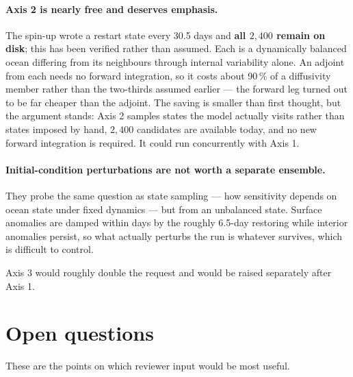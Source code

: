 \paragraph{Axis 2 is nearly free and deserves emphasis.}
The spin-up wrote a restart state every 30.5 days and \textbf{all $2{,}400$
remain on disk}; this has been verified rather than assumed. Each is a
dynamically balanced ocean differing from its neighbours through internal
variability alone. An adjoint from each needs no forward integration, so it costs
about 90\,\% of a diffusivity member rather than the two-thirds assumed earlier
--- the forward leg turned out to be far cheaper than the adjoint. The saving is
smaller than first thought, but the argument stands: Axis 2 samples states the
model actually visits rather than states imposed by hand, $2{,}400$ candidates
are available today, and no new forward integration is required. It could run
concurrently with Axis 1.

\paragraph{Initial-condition perturbations are not worth a separate ensemble.}
They probe the same question as state sampling --- how sensitivity depends on
ocean state under fixed dynamics --- but from an unbalanced state. Surface
anomalies are damped within days by the roughly 6.5-day restoring while interior
anomalies persist, so what actually perturbs the run is whatever survives, which
is difficult to control.

Axis 3 would roughly double the request and would be raised separately after
Axis 1.

\section{Open questions}
\label{sec:questions}

These are the points on which reviewer input would be most useful.

